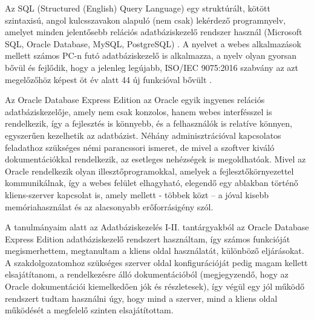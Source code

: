 Az SQL (Structured (English) Query Language) egy struktúrált, kötött szintaxisú, angol kulcsszavakon alapuló (nem csak) lekérdező programnyelv, amelyet minden jelentősebb relációs adatbáziskezelő rendszer használ (Microsoft SQL, Oracle Database, MySQL, PostgreSQL) \cite{kovacs_laszlo_adatbazisok}. A nyelvet a webes alkalmazások mellett számos PC-n futó adatbáziskezelő is alkalmazza, a nyelv olyan gyorsan bővül és fejlődik, hogy a jelenleg legújabb, ISO/IEC 9075:2016 \cite{iso_iec_sql} szabvány az azt megelőzőhöz képest öt év alatt 44 új funkcióval bővült \cite{whats_new_in_sql}.


Az Oracle Database Express Edition az Oracle egyik ingyenes relációs adatbáziskezelője, amely nem csak konzolos, hanem webes interfésszel is rendelkezik, így a fejlesztés is könnyebb, és a felhasználók is relatíve könnyen, egyszerűen kezelhetik az adatbázist. Néhány adminisztrációval kapcsolatos feladathoz szükséges némi parancssori ismeret, de mivel a szoftver kiváló dokumentációkkal rendelkezik, az esetleges nehézségek is megoldhatóak. Mivel az Oracle rendelkezik olyan illesztőprogramokkal, amelyek a fejlesztőkörnyezettel kommunikálnak, így a webes felület elhagyható, elegendő egy ablakban történő kliens-szerver kapcsolat is, amely mellett - többek közt – a jóval kisebb memóriahasználat és az alacsonyabb erőforrásigény szól.\par
A tanulmányaim alatt az Adatbáziskezelés I-II. tantárgyakból az Oracle Database Express Edition adatbáziskezelő rendszert használtam, így számos funkcióját megismerhettem, megtanultam a kliens oldal használatát, különböző eljárásokat. A szakdolgozatomhoz szükséges szerver oldal konfigurációját pedig magam kellett elsajátítanom, a rendelkezésre álló dokumentációból (megjegyzendő, hogy az Oracle dokumentációi kiemelkedően jók és részletesek), így végül egy jól működő rendszert tudtam használni úgy, hogy mind a szerver, mind a kliens oldal működését a megfelelő szinten elsajátítottam.\par


